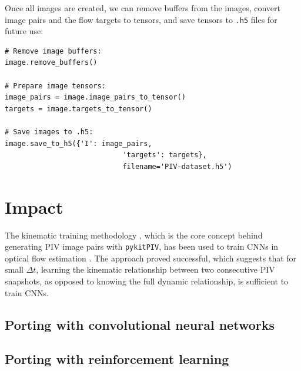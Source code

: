 \documentclass[a4paper,fleqn]{cas-dc}
\newcommand{ \kamila}[1]{\color{blue}{Kamila: #1} \color{black}}
\begin{document}
Once all images are created, we can remove buffers from the images, convert image pairs and the flow targets to tensors, and save tensors to \texttt{.h5} files for future use:
\lstset{language=Python}
\begin{lstlisting}
# Remove image buffers:
image.remove_buffers()

# Prepare image tensors:
image_pairs = image.image_pairs_to_tensor()
targets = image.targets_to_tensor()

# Save images to .h5:
image.save_to_h5({'I': image_pairs, 
							'targets': targets}, 
							filename='PIV-dataset.h5')
\end{lstlisting}

\section{Impact} \label{sec:results}

The kinematic training methodology \cite{manickathan2022kinematic}, which is the core concept behind generating PIV image pairs with \texttt{pykitPIV}, has been used to train CNNs in optical flow estimation \cite{manickathan2022kinematic, manickathan2023lightweight, mucignat2023lightweight}. The approach proved successful, which suggests that for small $\Delta t$, learning the kinematic relationship between two consecutive PIV snapshots, as opposed to knowing the full dynamic relationship, is sufficient to train CNNs.




\kamila{It would be great if we could extend image generation to synthetic event-based camera datasets. This would make the software truly novel.}

\kamila{Perhaps a nice novelty would be to allow the user to add solid boundaries into the image?}


\subsection{Porting with convolutional neural networks}

\kamila{Here we can describe what can be achieved in terms of training a CNN.}

\subsection{Porting with reinforcement learning}

\kamila{Here we can describe what can be achieved in terms of training an RL agent, e.g. in the context of autonomous experimentation. Maybe the agent will learn to augment the dataset in real time to account for changing experimental settings.}
\end{document}
